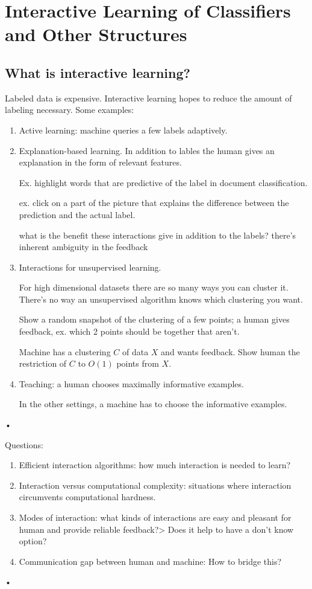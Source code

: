\section{Interactive Learning of Classifiers and Other Structures}

\subsection{What is interactive learning?}

Labeled data is expensive. Interactive learning hopes to reduce the amount of labeling necessary. Some examples:
\begin{enumerate}
\item
Active learning: machine queries a few labels adaptively.
\item
Explanation-based learning. In addition to lables the human gives an explanation in the form of relevant features.

Ex. highlight words that are predictive of the label in document classification.

ex. click on a part of the picture that explains the difference between the prediction and the actual label.

what is the benefit these interactions give in addition to the labels?
there's inherent ambiguity in the feedback
\item
Interactions for unsupervised learning.

For high dimensional datasets there are so many ways you can cluster it. There's no way an unsupervised algorithm knows which clustering you want.

Show a random snapshot of the clustering of a few points; a human gives feedback, ex. which 2 points should be together that aren't.

Machine has a clustering $C$ of data $X$ and wants feedback. Show human the restriction of $C$ to $O(1)$ points from $X$.
\item
Teaching: a human chooses maximally informative examples. 

In the other settings, a machine has to choose the informative examples.
\end{enumerate}•


Questions: 
\begin{enumerate}
\item
Efficient interaction algorithms: how much interaction is needed to learn?
\item
Interaction versus computational complexity: situations where interaction circumvents computational hardness.
\item
Modes of interaction: what kinds of interactions are easy and pleasant for human and provide reliable feedback?> Does it help to have a don't know option?
\item
Communication gap between human and machine: How to bridge this?
\end{enumerate}•



